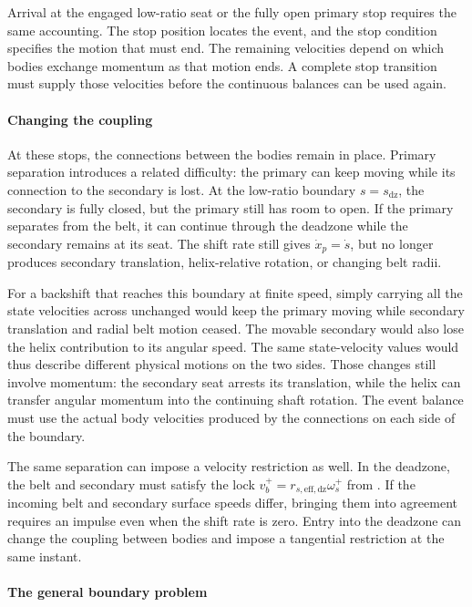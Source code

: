 \documentclass[11pt]{report}
\numberwithin{equation}{section}
\begin{document}
Arrival at the engaged low-ratio seat or the fully open primary stop
requires the same accounting. The stop position locates the event, and
the stop condition specifies the motion that must end. The remaining
velocities depend on which bodies exchange momentum as that motion ends.
A complete stop transition must supply those velocities before the
continuous balances can be used again.

\paragraph{Changing the coupling}

At these stops, the connections between the bodies remain in place.
Primary separation introduces a related difficulty: the primary can keep
moving while its connection to the secondary is lost. At the low-ratio
boundary \(s=s_{\mathrm{dz}}\), the secondary is fully closed, but the
primary still has room to open. If the primary separates from the belt,
it can continue through the deadzone while the secondary remains at its
seat. The shift rate still gives \(\dot x_p=\dot s\), but no longer
produces secondary translation, helix-relative rotation, or changing belt
radii.

For a backshift that reaches this boundary at finite speed, simply
carrying all the state velocities across unchanged would keep the primary
moving while secondary translation and radial belt motion ceased. The
movable secondary would also lose the helix contribution to its angular
speed. The same state-velocity values would thus describe different
physical motions on the two sides. Those changes still involve momentum:
the secondary seat arrests its translation, while the helix can transfer
angular momentum into the continuing shaft rotation. The event balance
must use the actual body velocities produced by the connections on each
side of the boundary.

The same separation can impose a velocity restriction as well. In the
deadzone, the belt and secondary must satisfy the lock
\(v_b^+=r_{s,\mathrm{eff,dz}}\omega_s^+\) from
. If the incoming belt and secondary
surface speeds differ, bringing them into agreement requires an impulse
even when the shift rate is zero. Entry into the deadzone can change the
coupling between bodies and impose a tangential restriction at the same
instant.

\paragraph{The general boundary problem}
\end{document}
